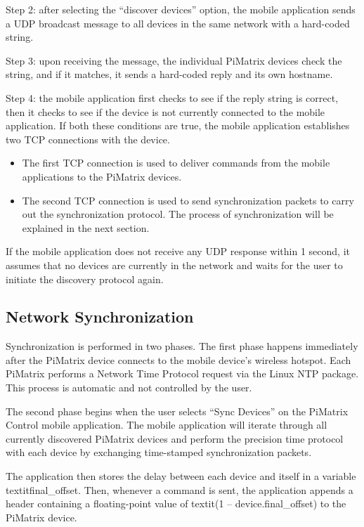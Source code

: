 \documentclass[hidelinks,12pt]{report} %
\begin{document}
Step 2: after selecting the “discover devices” option, the mobile application sends a UDP broadcast message to all devices in the same network with a hard-coded string.

Step 3: upon receiving the message, the individual PiMatrix devices check the string, and if it matches, it sends a hard-coded reply and its own hostname. 

Step 4: the mobile application first checks to see if the reply string is correct, then it checks to see if the device is not currently connected to the mobile application. If both these conditions are true, the mobile application establishes two TCP connections with the device. 

	\begin{itemize}
		\item{The first TCP connection is used to deliver commands from the mobile applications to the PiMatrix devices.}

		\item{The second TCP connection is used to send synchronization packets to carry out the synchronization protocol. The process of synchronization will be explained in the next section.}
	\end{itemize}

If the mobile application does not receive any UDP response within 1 second, it assumes that no devices are currently in the network and waits for the user to initiate the discovery protocol again. 


\subsection{Network Synchronization}

Synchronization is performed in two phases. The first phase happens immediately after the PiMatrix device connects to the mobile device’s wireless hotspot. Each PiMatrix performs a Network Time Protocol request via the Linux NTP package. This process is automatic and not controlled by the user.

The second phase begins when the user selects “Sync Devices” on the PiMatrix Control mobile application. The mobile application will iterate through all currently discovered PiMatrix devices and perform the precision time protocol with each device by exchanging time-stamped synchronization packets. 

The application then stores the delay between each device and itself in a variable textit{final\_offset}. Then, whenever a command is sent, the application appends a header containing a floating-point value of textit{(1 – device.final\_offset)} to the PiMatrix device. 
\end{document}
